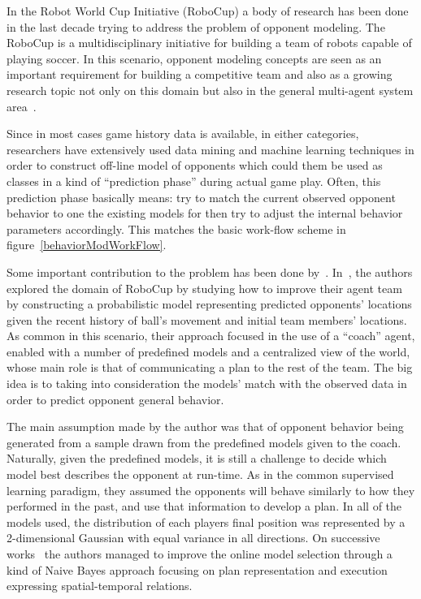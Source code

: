 In the Robot World Cup Initiative (RoboCup) a body of research has been done in the last decade trying to address the problem of opponent modeling. The RoboCup is a multidisciplinary initiative for building a team of robots capable of playing soccer. In this scenario, opponent modeling concepts are seen as an important requirement for building a competitive team and also as a growing research topic not only on this domain but also in the general multi-agent system area~\cite{rofer_overview_2012}. 

Since in most cases game history data is available, in either categories, researchers have extensively used data mining and machine learning techniques in order to construct off-line model of opponents which could them be used as classes in a kind of ``prediction phase'' during actual game play. Often, this prediction phase basically means: try to match the current observed opponent behavior to one the existing models for then try to adjust the internal behavior parameters accordingly. This matches the basic work-flow scheme in figure~\ref{behaviorModWorkFlow}.

Some important contribution to the problem has been done by~\cite{fix_behavior_2000,riley_recognizing_2002,riley_coaching_2001,riley_planning_2002}. In~\cite{riley_recognizing_2002}, the authors explored the domain of RoboCup by studying how to improve their agent team by constructing a probabilistic model representing predicted opponents' locations given the recent history of ball's movement and initial team members' locations. As common in this scenario, their approach focused in the use of a ``coach'' agent, enabled with a number of predefined models and a centralized view of the world, whose main role is that of communicating a plan to the rest of the team. The big idea is to taking into consideration the models' match with the observed data in order to predict opponent general behavior. 

The main assumption made by the author was that of opponent behavior being generated from a sample drawn from the predefined models given to the coach. Naturally, given the predefined models, it is still a challenge to decide which model best describes the opponent at run-time. As in the common supervised learning paradigm, they assumed the opponents will behave similarly to how they performed in the past, and use that information to develop a plan. In all of the models used, the distribution of each players final position was represented by a 2-dimensional Gaussian with equal variance in all directions. On successive works~\cite{riley_coaching_2001,riley_planning_2002} the authors managed to improve the online model selection through a kind of Naive Bayes approach focusing on plan representation and execution expressing spatial-temporal relations. 

